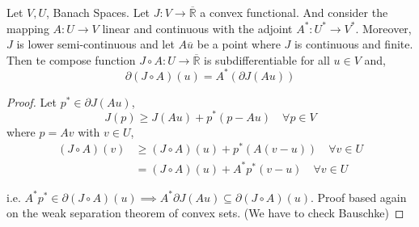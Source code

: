 \begin{theorem}
	Let $V, U$, Banach Spaces. Let $J:V \rightarrow \overline{\mathbb{R}}$ a convex functional. And consider the mapping $A: U\rightarrow V$ linear and continuous with the adjoint $A^*:U^*\rightarrow V^*$. Moreover, $J$ is lower semi-continuous and let $A\overline{u}$ be a point where $J$ is continuous and finite. Then te compose function $J\circ A: U\rightarrow \overline{\mathbb{R}}$ is subdifferentiable for all $u\in V$ and, 
	\[
		\partial(J\circ A)(u)=A^*\left(\partial J(Au)\right)
	\]
	\begin{proof}
		Let $p^*\in \partial J(Au)$,
		\[
			J(p)\geq J(Au)+p^*(p-Au) \quad \forall p \in V 
		\]
		where $p=Av$ with $v\in U$,
		\begin{align}
			(J\circ A) (v) &\geq (J\circ A) (u)+p^*(A(v-u)) \quad \forall v \in U \\
						   &=(J\circ A)(u)+A^*p^*(v-u) \quad \forall v \in U
		\end{align}
		
		i.e. $A^*p^* \in \partial (J\circ A)(u) \implies A^* \partial J(Au)\subseteq \partial (J\circ A)(u)$. Proof based again on the weak separation theorem of convex sets. (We have to check Bauschke)
	\end{proof}
\end{theorem}

